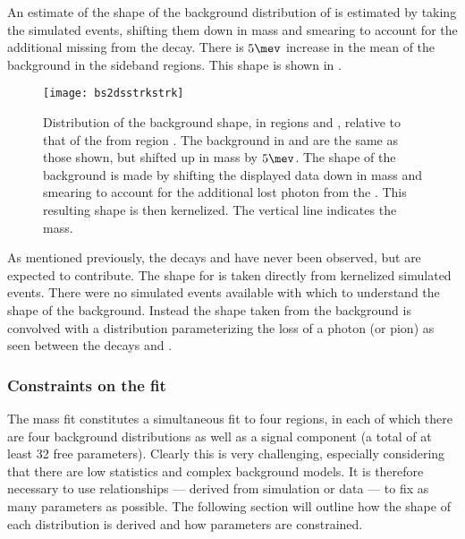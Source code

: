 An estimate of the shape of the background distribution of \bstodsstrkstrk is estimated by taking
the simulated \bstodskstrk events, shifting them down in mass and smearing to account for the
additional missing \photon from the \Dss decay.
There is $5\mev$ increase in the mean of the background in the \phii sideband regions.
This shape is shown in .

\begin{figure}
  \begin{center}
    \texttt{[image: bs2dsstrkstrk]}
    \caption[Shapes of background contributions of \bstodsstrkstrk]
    {\small
      Distribution of the \bstodsstrkstrk background shape, in regions \rA and \rB, relative to
      that of the \bstodskstrk from region \rA.
      The \bstodsstrkstrk background in \rC and \rD are the same as those shown, but shifted up in
      mass by $5\mev$.
      The shape of the \bstodsstrkstrk background is made by shifting the displayed data down in
      mass and smearing to account for the additional lost photon from the \Dss.
      This resulting shape is then kernelized.
      The vertical line indicates the \Bp mass.
    }
    \label{fig:dsphi:bstodsstrkstrk}
  \end{center}
\end{figure}

As mentioned previously, the decays \bstodskstrk and \bstodsstrkstrk have never been observed, but
are expected to contribute.
The shape for \bstodskstrk is taken directly from kernelized simulated events.
There were no simulated events available with which to understand the shape of the \bstodsstrkstrk
background.
Instead the shape taken from the \bstodskstrk background is convolved with a distribution
parameterizing the loss of a photon (or pion) as seen between the decays \btodsstrphi and
\bstodskstrk.




\subsubsection{Constraints on the fit}
The mass fit constitutes a simultaneous fit to four regions, in each of which there are four
background distributions as well as a signal component (a total of at least 32 free parameters).
Clearly this is very challenging, especially considering that there are low statistics and complex
background models.
It is therefore necessary to use relationships --- derived from simulation or data --- to fix as
many parameters as possible.
The following section will outline how the shape of each distribution is derived and how
parameters are constrained.

